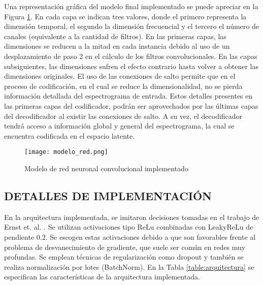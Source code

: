 Una representación gráfica del modelo final implementado se puede apreciar en la Figura \ref{fig:modelo}. En cada capa se indican tres valores, donde el primero representa la dimensión temporal, el segundo la dimensión frecuencial y el tercero el número de canales (equivalente a la cantidad de filtros). En las primeras capas, las dimensiones se reducen a la mitad en cada instancia debido al uso de un desplazamiento de paso 2 en el cálculo de los filtros convolucionales. En las capas subsiguientes, las dimensiones sufren el efecto contrario hasta volver a obtener las dimensiones originales. El uso de las conexiones de salto permite que en el proceso de codificación, en el cual se reduce la dimensionalidad, no se pierda información detallada del espectrograma de entrada. Estos detalles presentes en las primeras capas del codificador, podrán ser aprovechados por las últimas capas del decodificador al existir las conexiones de salto. A su vez, el decodificador tendrá acceso a información global y general del espectrograma, la cual se encuentra codificada en el espacio latente.

\begin{figure}[H]
	\centering{}
	\texttt{[image: modelo\_red.png]}
	\caption{Modelo de red neuronal convolucional implementado}
	\label{fig:modelo}
\end{figure}

\subsection[Detalles de implementación]{DETALLES DE IMPLEMENTACIÓN}

En la arquitectura implementada, se imitaron decisiones tomadas en el trabajo de Ernst et. al. \cite{FCN}. Se utilizan activaciones tipo ReLu combinadas con LeakyReLu  de pendiente $0.2$. Se escogen estas activaciones debido a que son favorables frente al problema de desvanecimiento de gradiente, que suele ser común en redes muy profundas. Se emplean técnicas de regularización como dropout y también se realiza normalización por lotes (BatchNorm). En la Tabla \ref{table:arquitectura} se especifican las características de la arquitectura implementada. 


